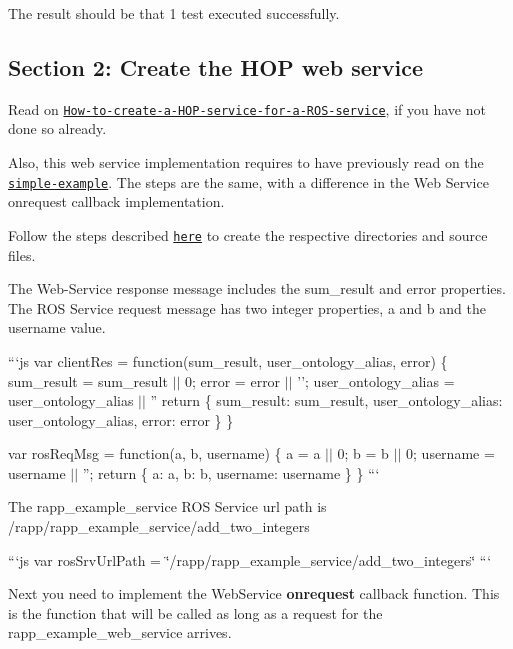 The result should be that 1 test executed successfully.

\subsection*{Section 2\-: Create the H\-O\-P web service}

Read on \href{https://github.com/rapp-project/rapp-platform/wiki/How-to-create-a-HOP-service-for-a-ROS-service%3F}{\tt How-\/to-\/create-\/a-\/\-H\-O\-P-\/service-\/for-\/a-\/\-R\-O\-S-\/service}, if you have not done so already.

Also, this web service implementation requires to have previously read on the \href{https://github.com/rapp-project/rapp-platform/wiki/A-full-RAPP-Platform-service-creation-example#section-2-create-the-hop-web-service}{\tt simple-\/example}. The steps are the same, with a difference in the Web Service onrequest callback implementation.

Follow the steps described \href{https://github.com/rapp-project/rapp-platform/wiki/A-full-RAPP-Platform-service-creation-example#section-2-create-the-hop-web-service}{\tt here} to create the respective directories and source files.

The Web-\/\-Service response message includes the {\ttfamily sum\-\_\-result} and {\ttfamily error} properties. The R\-O\-S Service request message has two integer properties, {\ttfamily a} and {\ttfamily b} and the {\ttfamily username} value.

```js var client\-Res = function(sum\-\_\-result, user\-\_\-ontology\-\_\-alias, error) \{ sum\-\_\-result = sum\-\_\-result $\vert$$\vert$ 0; error = error $\vert$$\vert$ ''; user\-\_\-ontology\-\_\-alias = user\-\_\-ontology\-\_\-alias $\vert$$\vert$ '' return \{ sum\-\_\-result\-: sum\-\_\-result, user\-\_\-ontology\-\_\-alias\-: user\-\_\-ontology\-\_\-alias, error\-: error \} \}

var ros\-Req\-Msg = function(a, b, username) \{ a = a $\vert$$\vert$ 0; b = b $\vert$$\vert$ 0; username = username $\vert$$\vert$ ''; return \{ a\-: a, b\-: b, username\-: username \} \} ```

The rapp\-\_\-example\-\_\-service R\-O\-S Service url path is {\ttfamily /rapp/rapp\-\_\-example\-\_\-service/add\-\_\-two\-\_\-integers}

```js var ros\-Srv\-Url\-Path = \char`\"{}/rapp/rapp\-\_\-example\-\_\-service/add\-\_\-two\-\_\-integers\char`\"{} ```

Next you need to implement the Web\-Service {\bfseries onrequest} callback function. This is the function that will be called as long as a request for the rapp\-\_\-example\-\_\-web\-\_\-service arrives.


